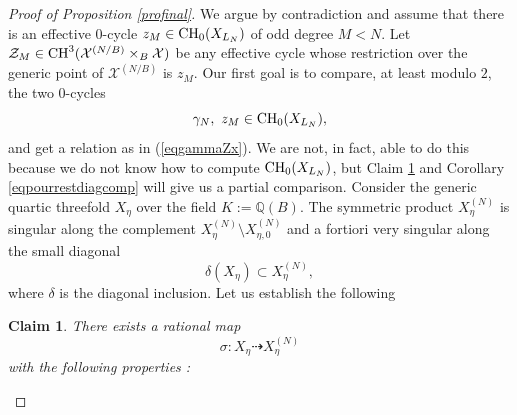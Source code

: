 \documentclass[10pt]{article}
\newtheorem{claim}[theo]{Claim}
\begin{document}
\begin{proof}[Proof of Proposition \ref{profinal}]  We argue by contradiction and assume that there is an effective $0$-cycle $z_M\in{\rm CH}_0(X_{L_N})$ of odd degree $M<N$. Let $\mathcal{Z}_M\in {\rm CH}^3(\mathcal{X}^{(N/B)}\times_B\mathcal{X})$ be any effective cycle whose restriction over the generic point of $\mathcal{X}^{(N/B)}$ is $z_M$. Our  first goal is to compare, at least modulo $2$, the two $0$-cycles
$$\gamma_{N},\,\,z_M\in {\rm CH}_0(X_{L_N}),$$    and get a relation as in (\ref{eqgammaZx}).
 We are not, in fact,  able to do this because we do not know how to compute  ${\rm CH}_0(X_{L_N})$, but Claim \ref{claim} and Corollary \ref{eqpourrestdiagcomp} will give us a partial comparison.
Consider  the generic  quartic threefold $X_\eta$ over the field $K:=\mathbb{Q}(B)$.  The symmetric product $X_{\eta}^{(N)}$ is singular along the complement
 $X_{\eta}^{(N)}\setminus  X_{\eta,0}^{(N)}$ and a fortiori  very singular along the small diagonal
$$\delta(X_{\eta})\subset X_{\eta}^{(N)},$$
where $\delta$ is the diagonal inclusion. Let us establish the following
\begin{claim} \label{claim} There exists a
rational map
$$\sigma: X_{\eta} \dashrightarrow X_{\eta}^{(N)}$$
with the following properties :


\end{claim}
\end{proof}
\end{document}
